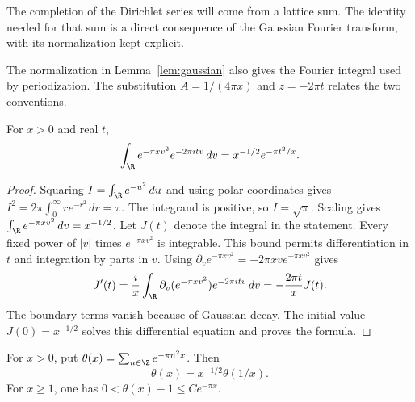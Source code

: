 The completion of the Dirichlet series will come from a lattice sum.
The identity needed for that sum is a direct consequence of the Gaussian
Fourier transform, with its normalization kept explicit.

The normalization in Lemma~\ref{lem:gaussian} also gives the Fourier
integral used by periodization.  The substitution
$A=1/(4\pi x)$ and $z=-2\pi t$ relates the two conventions.

\begin{lemma}
\label{lem:gaussian-real-transform}
For $x>0$ and real $t$,
\[
 \int_{\R}e^{-\pi xv^2}e^{-2\pi itv}\,dv
       =x^{-1/2}e^{-\pi t^2/x}.
\]
\end{lemma}
\begin{proof}
Squaring $I=\int_{\R}e^{-u^2}\,du$ and using polar coordinates gives
$I^2=2\pi\int_0^\infty re^{-r^2}\,dr=\pi$.
The integrand is positive, so $I=\sqrt\pi$.
Scaling gives $\int_{\R}e^{-\pi xv^2}\,dv=x^{-1/2}$.
Let $J(t)$ denote the integral in the statement.
Every fixed power of $|v|$ times $e^{-\pi xv^2}$ is integrable.
This bound permits differentiation in $t$ and integration by parts in $v$.
Using $\partial_v e^{-\pi xv^2}=-2\pi xv e^{-\pi xv^2}$ gives
\[
 J'(t)=\frac{i}{x}\int_{\R}
       \partial_v(e^{-\pi xv^2})e^{-2\pi itv}\,dv
       =-\frac{2\pi t}{x}J(t).
\]
The boundary terms vanish because of Gaussian decay.
The initial value $J(0)=x^{-1/2}$ solves this differential equation
and proves the formula.
\end{proof}

\begin{lemma}
\label{lem:theta}
For $x>0$, put $\theta(x)=\sum_{n\in\Z}e^{-\pi n^2x}$.
Then
\begin{equation}
 \theta(x)=x^{-1/2}\theta(1/x).
 \label{eq:theta-reflection}
\end{equation}
For $x\geq1$, one has $0<\theta(x)-1\leq C e^{-\pi x}$.
\end{lemma}

